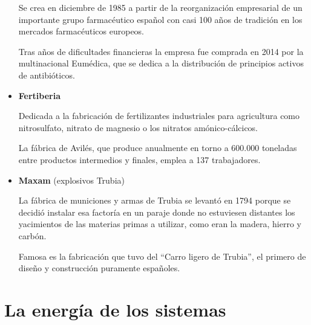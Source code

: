 \documentclass[
  spanish,
]{article}
\begin{document}
\begin{itemize}
  Se crea en diciembre de 1985 a partir de la reorganización empresarial
  de un importante grupo farmacéutico español con casi 100 años de
  tradición en los mercados farmacéuticos europeos.

  Tras años de dificultades financieras la empresa fue comprada en 2014
  por la multinacional Eumédica, que se dedica a la distribución de
  principios activos de antibióticos.
\item
  \textbf{Fertiberia}

  Dedicada a la fabricación de fertilizantes industriales para
  agricultura como nitrosulfato, nitrato de magnesio o los nitratos
  amónico-cálcicos.

  La fábrica de Avilés, que produce anualmente en torno a 600.000
  toneladas entre productos intermedios y finales, emplea a 137
  trabajadores.
\item
  \textbf{Maxam} (explosivos Trubia)

  La fábrica de municiones y armas de Trubia se levantó en 1794 porque
  se decidió instalar esa factoría en un paraje donde no estuviesen
  distantes los yacimientos de las materias primas a utilizar, como eran
  la madera, hierro y carbón.

  Famosa es la fabricación que tuvo del ``Carro ligero de Trubia'', el
  primero de diseño y construcción puramente españoles.

  \hfill{}
\end{itemize}

\hypertarget{la-energuxeda-de-los-sistemas}{%
\section{La energía de los
sistemas}\label{la-energuxeda-de-los-sistemas}}
\end{document}
